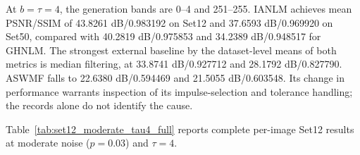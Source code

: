 \documentclass[pdflatex,iicol,sn-mathphys-num]{sn-jnl}
\newif\ifshowportuguese
\newcommand{\pt}[1]{\ifshowportuguese\par\begingroup\small\color{blue!55!black}\noindent\textbf{PT: }#1\par\endgroup\fi}
\begin{document}
At $b=\tau=4$, the generation bands are 0--4 and 251--255. IANLM achieves mean PSNR/SSIM of 43.8261 dB/0.983192 on Set12 and 37.6593 dB/0.969920 on Set50, compared with 40.2819 dB/0.975853 and 34.2389 dB/0.948517 for GHNLM. The strongest external baseline by the dataset-level means of both metrics is median filtering, at 33.8741 dB/0.927712 and 28.1792 dB/0.827790. ASWMF falls to 22.6380 dB/0.594469 and 21.5055 dB/0.603548. Its change in performance warrants inspection of its impulse-selection and tolerance handling; the records alone do not identify the cause.
\pt{Em $b=\tau=4$, as faixas de geração são 0--4 e 251--255. O IANLM alcança PSNR/SSIM médios de 43,8261 dB/0,983192 no Set12 e 37,6593 dB/0,969920 no Set50, comparados com 40,2819 dB/0,975853 e 34,2389 dB/0,948517 do GHNLM. O baseline externo mais forte pelas médias por conjunto das duas métricas é o filtro de mediana, com 33,8741 dB/0,927712 e 28,1792 dB/0,827790. O ASWMF cai para 22,6380 dB/0,594469 e 21,5055 dB/0,603548. Sua mudança de desempenho justifica inspecionar a seleção de impulsos e o tratamento da tolerância; os registros, isoladamente, não identificam a causa.}
Table~\ref{tab:set12_moderate_tau4_full} reports complete per-image Set12 results at moderate noise ($p=0.03$) and $\tau=4$.
\pt{A Tabela~\ref{tab:set12_moderate_tau4_full} apresenta os resultados completos por imagem do Set12 sob ruído moderado ($p=0.03$) e $\tau=4$.}
\end{document}
